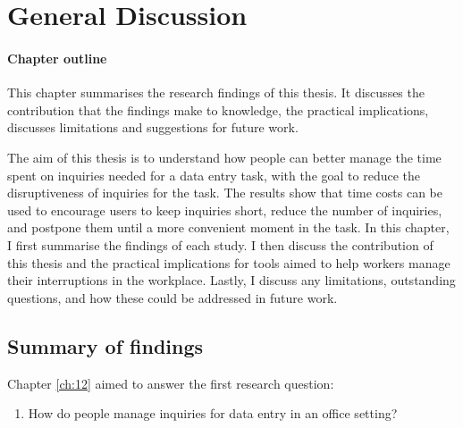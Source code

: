 \chapter{General Discussion}\label{ch:Discussion}

\begin{mynote}
\subsubsection{Chapter outline}
This chapter summarises the research findings of this thesis. It discusses the contribution that the findings make to knowledge, the practical implications, discusses limitations and suggestions for future work.
\end{mynote}

The aim of this thesis is to understand how people can better manage the time spent on inquiries needed for a data entry task, with the goal to reduce the disruptiveness of inquiries for the task. The results show that time costs can be used to encourage users to keep inquiries short, reduce the number of inquiries, and postpone them until a more convenient moment in the task. In this chapter, I first summarise the findings of each study. I then discuss the contribution of this thesis and the practical implications for tools aimed to help workers manage their interruptions in the workplace. Lastly, I discuss any limitations, outstanding questions, and how these could be addressed in future work. 

\section{Summary of findings}
Chapter \ref{ch:12} aimed to answer the first research question:

\begin{enumerate}
\item
How do people manage inquiries for data entry in an office setting?
\end{enumerate}

